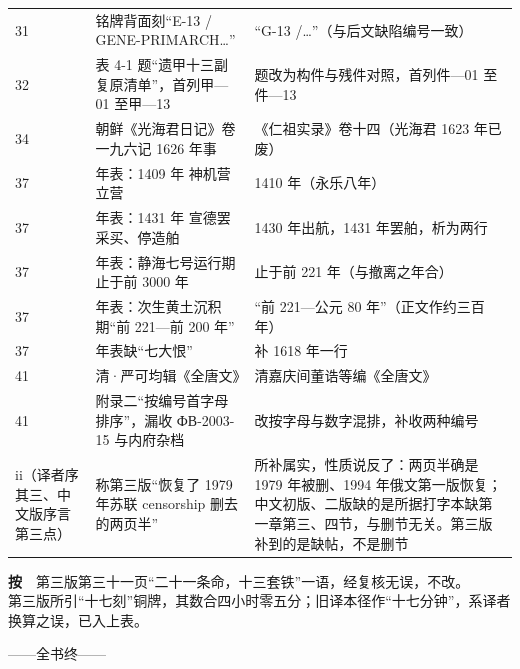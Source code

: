 {\begin{longtable}{@{}p{17mm}p{58mm}p{58mm}@{}}
31 & 铭牌背面刻“E-13 / GENE-PRIMARCH…” & “G-13 /…”（与后文缺陷编号一致）\\
32 & 表 4-1 题“遗甲十三副复原清单”，首列甲—01 至甲—13 & 题改为构件与残件对照，首列件—01 至件—13\\
34 & 朝鲜《光海君日记》卷一九六记 1626 年事 & 《仁祖实录》卷十四（光海君 1623 年已废）\\
37 & 年表：1409 年 神机营立营 & 1410 年（永乐八年）\\
37 & 年表：1431 年 宣德罢采买、停造舶 & 1430 年出航，1431 年罢舶，析为两行\\
37 & 年表：静海七号运行期止于前 3000 年 & 止于前 221 年（与撤离之年合）\\
37 & 年表：次生黄土沉积期“前 221—前 200 年” & “前 221—公元 80 年”（正文作约三百年）\\
37 & 年表缺“七大恨” & 补 1618 年一行\\
41 & 清·严可均辑《全唐文》 & 清嘉庆间董诰等编《全唐文》\\
41 & 附录二“按编号首字母排序”，漏收 ФВ-2003-15 与内府杂档 & 改按字母与数字混排，补收两种编号\\
ii（译者序其三、中文版序言第三点） & 称第三版“恢复了 1979 年苏联 censorship 删去的两页半” & 所补属实，性质说反了：两页半确是 1979 年被删、1994 年俄文第一版恢复；中文初版、二版缺的是所据打字本缺第一章第三、四节，与删节无关。第三版补到的是缺帖，不是删节\\
\bottomrule
\end{longtable}
}

\vspace{3mm}
{\footnotesize
\textbf{按}　第三版第三十一页“二十一条命，十三套铁”一语，经复核无误，不改。\\
第三版所引“十七刻”铜牌，其数合四小时零五分；旧译本径作“十七分钟”，系译者换算之误，已入上表。\\
}

\vspace{8mm}
\begin{center}
{\small\color{pencil}
——\quad 全书终\quad ——}
\end{center}
